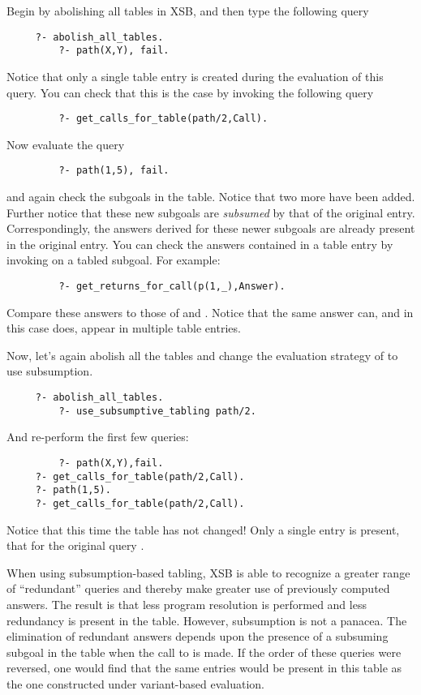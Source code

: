 \begin{exercise} \label{ex:VarVsSub}
Begin by abolishing all tables in XSB, and then type the following query
\begin{verbatim}
	 ?- abolish_all_tables.
         ?- path(X,Y), fail.
\end{verbatim}
Notice that only a single table entry is created during the evaluation
of this query.  You can check that this is the case by invoking the
following query
\begin{verbatim}
         ?- get_calls_for_table(path/2,Call).
\end{verbatim}
Now evaluate the query
\begin{verbatim}
         ?- path(1,5), fail.
\end{verbatim}
and again check the subgoals in the table.  Notice that two more have
been added.  Further notice that these new subgoals are
\emph{subsumed} by that of the original entry.  Correspondingly, the
answers derived for these newer subgoals are already present in the
original entry.  You can check the answers contained in a table entry
by invoking  on a tabled subgoal.  For
example:
\begin{verbatim}
         ?- get_returns_for_call(p(1,_),Answer).
\end{verbatim}
Compare these answers to those of  and .
Notice that the same answer can, and in this case does, appear in
multiple table entries.

Now, let's again abolish all the tables and change the evaluation
strategy of  to use subsumption.
\begin{verbatim}
	 ?- abolish_all_tables.
         ?- use_subsumptive_tabling path/2.
\end{verbatim}
And re-perform the first few queries:
\begin{verbatim}
         ?- path(X,Y),fail.
	 ?- get_calls_for_table(path/2,Call).
	 ?- path(1,5).
	 ?- get_calls_for_table(path/2,Call).
\end{verbatim}
Notice that this time the table has not changed!  Only a single entry
is present, that for the original query .
\end{exercise}
%
When using subsumption-based tabling, XSB is able to recognize a greater
range of ``redundant'' queries and thereby make greater use of
previously computed answers.  The result is that less program resolution
is performed and less redundancy is present in the table.  However,
subsumption is not a panacea.  The elimination of redundant answers
depends upon the presence of a subsuming subgoal in the table when the
call to  is made.  If the order of these queries were
reversed, one would find that the same entries would be present in this
table as the one constructed under variant-based evaluation.

